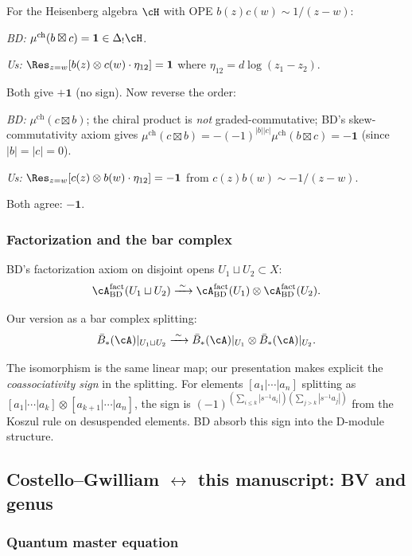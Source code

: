 \begin{example}
For the Heisenberg algebra $\cH$ with OPE $b(z)c(w) \sim 1/(z-w)$:

\emph{BD:} $\mu^{\mathrm{ch}}(b \boxtimes c) = \mathbf{1} \in \Delta_!\cH$.

\emph{Us:} $\Res_{z=w}[b(z) \otimes c(w) \cdot \eta_{12}] = \mathbf{1}$
where $\eta_{12} = d\log(z_1 - z_2)$.

Both give $+\mathbf{1}$ (no sign).
Now reverse the order:

\emph{BD:} $\mu^{\mathrm{ch}}(c \boxtimes b)$; the chiral product is \emph{not}
graded-commutative; BD's skew-commutativity axiom gives
$\mu^{\mathrm{ch}}(c \boxtimes b) = -(-1)^{|b||c|}\mu^{\mathrm{ch}}(b \boxtimes c) = -\mathbf{1}$
(since $|b| = |c| = 0$).

\emph{Us:} $\Res_{z=w}[c(z) \otimes b(w) \cdot \eta_{12}] = -\mathbf{1}$
from $c(z)b(w) \sim -1/(z-w)$.

Both agree: $-\mathbf{1}$.
\end{example}

\subsubsection{Factorization and the bar complex}

BD's factorization axiom on disjoint opens $U_1 \sqcup U_2 \subset X$:
\[
\cA^{\mathrm{fact}}_{\mathrm{BD}}(U_1 \sqcup U_2) \xrightarrow{\;\sim\;} \cA^{\mathrm{fact}}_{\mathrm{BD}}(U_1) \otimes \cA^{\mathrm{fact}}_{\mathrm{BD}}(U_2).
\]

Our version as a bar complex splitting:
\[
\bar{B}_*(\cA)|_{U_1 \sqcup U_2} \xrightarrow{\;\sim\;} \bar{B}_*(\cA)|_{U_1} \otimes \bar{B}_*(\cA)|_{U_2}.
\]

The isomorphism is the same linear map; our presentation makes explicit the
\emph{coassociativity sign} in the splitting. For elements
$[a_1|\cdots|a_n]$ splitting as $[a_1|\cdots|a_k] \otimes [a_{k+1}|\cdots|a_n]$,
the sign is $(-1)^{(\sum_{i\leq k}|s^{-1}a_i|)(\sum_{j>k}|s^{-1}a_j|)}$
from the Koszul rule on desuspended elements. BD absorb this sign into the
D-module structure.

\subsection{Costello--Gwilliam $\leftrightarrow$ this manuscript: BV and genus}
\label{sec:cg-us-formulas}

\subsubsection{Quantum master equation}

